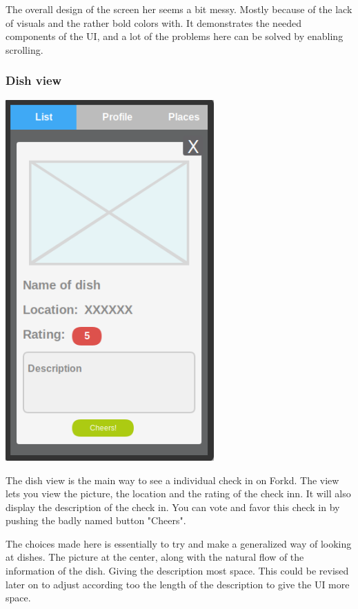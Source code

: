 \documentclass[12pt]{article}
\begin{document}
The overall design of the screen her seems a bit messy. Mostly because of the
lack of visuals and the rather bold colors with. It demonstrates the needed
components of the UI, and a lot of the problems here can be solved by enabling
scrolling.


\subsubsection{Dish view}
\includegraphics[width=8cm]{pictures/prototype/dish}
\bigbreak

The dish view is the main way to see a individual check in on Forkd. The view
lets you view the picture, the location and the rating of the check inn. It will
also display the description of the check in. You can vote and favor this check
in by pushing the badly named button "Cheers".

The choices made here is essentially to try and make a generalized way of
looking at dishes. The picture at the center, along with the natural flow of the
information of the dish. Giving the description most space. This could be
revised later on to adjust according too the length of the description to give
the UI more space.
 
\end{document}
